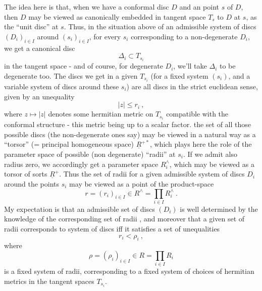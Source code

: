 The idea here is that, when we have a conformal disc $D$ and an  point $s$ of $D$, then $D$ may be viewed as canonically embedded in  tangent space $T_s$ to $D$ at $s$, as the ``unit disc'' at $s$. Thus, in the situation above of an admissible system of discs $(D_i)_{i\in I}$ around $(s_i)_{i\in I}$, for every $s_i$ corresponding to a non-degenerate $D_i$, we get a canonical disc
\[
\Delta_i\subset T_{s_i}
\]
in the tangent space - and of course, for degenerate $D_i$, we'll take $\Delta_i$ to be degenerate too. The discs we get in a given $T_{s_i}$ (for a fixed system $(s_i)$, and a variable  system of discs around these $s_i$) are all discs in the strict euclidean sense, given by an unequality
\[
|z|\le r_i\ ,
\]
where $z\mapsto|z|$ denotes some hermitian metric on $T_{s_i}$ compatible with the conformal structure - this metric being  up to a scalar factor. the set of all those possible discs (the non-degenerate ones\deleted{\unsure{,}} say) may be viewed in a natural way as a ``torsor'' (= principal homogeneous space)
 $\underline R^{+*}$, which plays here the role of the parameter space of  possible (non degenerate) ``radii'' at $s_i$. If we admit also radius zero, we accordingly get a parameter space $R_i^{\wedge}$, which may be viewed as a torsor of sorts  $\underline R^+$. Thus the set of radii for a given admissible system of discs $D_i$ around the points $s_i$ may be viewed as a point of the product-space
\[
r=(r_i)_{i\in I}\in R^{\wedge}=\prod_{i\in I}R_i^{\wedge}\ .
\]
My expectation is that an admissible set of discs $(D_i)$ is well determined by the knowledge of the corresponding set of radii , and moreover that a given set of radii  corresponds to  system of  discs iff it satisfies a set of unequalities
\[
r_i<\rho_i\ ,
\]
where
\[
\rho=(\rho_i)_{i\in I}\in R=\prod_{i\in I}R_i
\]
is a  fixed system of radii, corresponding to a fixed system of choices of hermitian metrics in the tangent spaces $T_{s_i}$.

